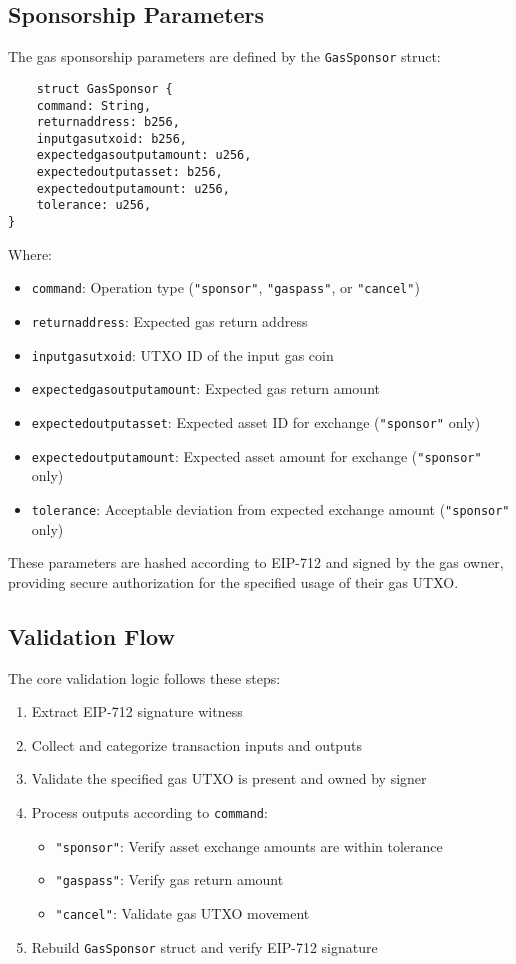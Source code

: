 \subsection{Sponsorship Parameters}
The gas sponsorship parameters are defined by the \texttt{GasSponsor} struct:
\begin{lstlisting}
    struct GasSponsor {
    command: String,
    returnaddress: b256,
    inputgasutxoid: b256,
    expectedgasoutputamount: u256,
    expectedoutputasset: b256,
    expectedoutputamount: u256,
    tolerance: u256,
}
\end{lstlisting}

Where:
\begin{itemize}
\item \texttt{command}: Operation type (\texttt{"sponsor"}, \texttt{"gaspass"}, or \texttt{"cancel"})
\item \texttt{returnaddress}: Expected gas return address
\item \texttt{inputgasutxoid}: UTXO ID of the input gas coin
\item \texttt{expectedgasoutputamount}: Expected gas return amount
\item \texttt{expectedoutputasset}: Expected asset ID for exchange (\texttt{"sponsor"} only)
\item \texttt{expectedoutputamount}: Expected asset amount for exchange (\texttt{"sponsor"} only)
\item \texttt{tolerance}: Acceptable deviation from expected exchange amount (\texttt{"sponsor"} only)
\end{itemize}

These parameters are hashed according to EIP-712 and signed by the gas owner, providing secure authorization for the
specified usage of their gas UTXO.\\


\subsection{Validation Flow}
The core validation logic follows these steps:

\begin{enumerate}
\item Extract EIP-712 signature witness
\item Collect and categorize transaction inputs and outputs
\item Validate the specified gas UTXO is present and owned by signer
\item Process outputs according to \texttt{command}:
\begin{itemize}
\item \texttt{"sponsor"}: Verify asset exchange amounts are within tolerance
\item \texttt{"gaspass"}: Verify gas return amount
\item \texttt{"cancel"}: Validate gas UTXO movement
\end{itemize}
\item Rebuild \texttt{GasSponsor} struct and verify EIP-712 signature
\end{enumerate}

